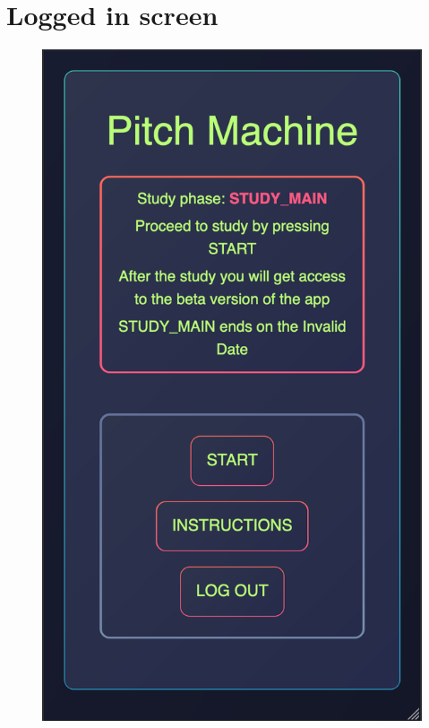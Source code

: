 \section{Logged in screen}
\begin{figure}[H]
\centering
\includegraphics[scale=.33]{Parts/Fig/loggedin.png}
\vspace*{-5mm}
\end{figure}

